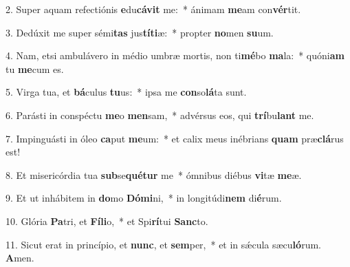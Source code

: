 2. Super aquam refectiónis \textbf{e}du\textbf{cá}\textbf{vit} me:~*  ánimam \textbf{me}am con\textbf{vér}tit.\

3. Dedúxit me super sémi\textbf{tas} jus\textbf{tí}\textbf{ti}æ:~*  propter \textbf{no}men \textbf{su}um.\

4. Nam, etsi ambulávero in médio umbræ mortis, non ti\textbf{mé}bo \textbf{ma}la:~*  quóni\textbf{am} tu \textbf{me}cum es.\

5. Virga tua, et \textbf{bá}culus \textbf{tu}us:~*  ipsa me \textbf{con}so\textbf{lá}ta sunt.\

6. Parásti in conspéctu \textbf{me}o \textbf{men}sam,~*  advérsus eos, qui \textbf{trí}bu\textbf{lant} me.\

7. Impinguásti in óleo \textbf{ca}put \textbf{me}um:~*  et calix meus inébrians \textbf{quam} præ\textbf{clá}rus est!\

8. Et misericórdia tua \textbf{sub}se\textbf{qué}\textbf{tur} me~*  ómnibus diébus \textbf{vi}tæ \textbf{me}æ.\

9. Et ut inhábitem in \textbf{do}mo \textbf{Dó}\textbf{mi}ni,~*  in longitúdi\textbf{nem} di\textbf{é}rum.\

10. Glória \textbf{Pa}tri, et \textbf{Fí}\textbf{li}o,~*  et Spi\textbf{rí}tui \textbf{Sanc}to.\

11. Sicut erat in princípio, et \textbf{nunc}, et \textbf{sem}per,~*  et in sǽcula sæcu\textbf{ló}rum. \textbf{A}men.\

